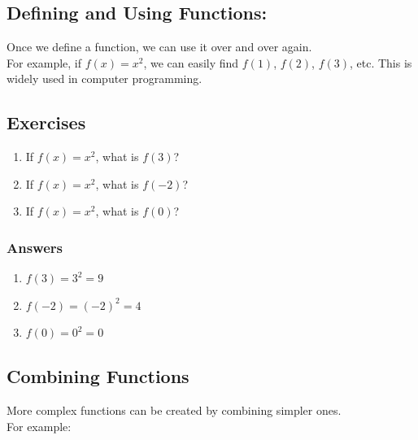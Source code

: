 \documentclass[12pt]{article}
\begin{document}
\subsection*{Defining and Using Functions:}
Once we define a function, we can use it over and over again.\\

For example, if \( f(x) = x^2 \), we can easily find \( f(1) \), \( f(2) \), \( f(3) \), etc. This is widely used in computer programming.

\subsection*{Exercises}

\begin{enumerate}
    \item If \( f(x) = x^2 \), what is \( f(3) \)?
    \item If \( f(x) = x^2 \), what is \( f(-2) \)?
    \item If \( f(x) = x^2 \), what is \( f(0) \)?
\end{enumerate}

\subsubsection*{Answers}

\begin{enumerate}
    \item \( f(3) = 3^2 = 9 \)
    \item \( f(-2) = (-2)^2 = 4 \)
    \item \( f(0) = 0^2 = 0 \)
\end{enumerate}

\subsection*{Combining Functions}

More complex functions can be created by combining simpler ones.\\

For example:
\end{document}
